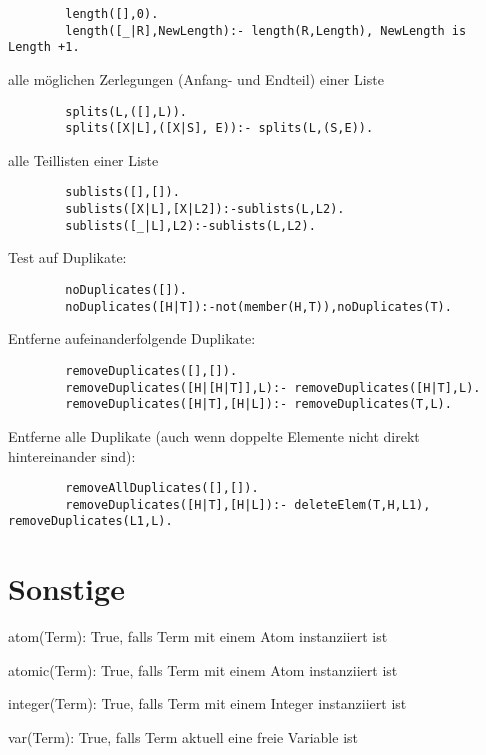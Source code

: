 \begin{compactitem}
		\begin{lstlisting}
		length([],0).
		length([_|R],NewLength):- length(R,Length), NewLength is Length +1.
		\end{lstlisting}	
	\item alle möglichen Zerlegungen (Anfang- und Endteil) einer Liste 
		\begin{lstlisting}
		splits(L,([],L)).
		splits([X|L],([X|S], E)):- splits(L,(S,E)).
		\end{lstlisting}	
	\item alle Teillisten einer Liste
		\begin{lstlisting}
		sublists([],[]).
		sublists([X|L],[X|L2]):-sublists(L,L2).
		sublists([_|L],L2):-sublists(L,L2).
		\end{lstlisting}
	\item Test auf Duplikate:
		\begin{lstlisting}
		noDuplicates([]).
		noDuplicates([H|T]):-not(member(H,T)),noDuplicates(T).
		\end{lstlisting}
	\item Entferne aufeinanderfolgende Duplikate:
		\begin{lstlisting}
		removeDuplicates([],[]).
		removeDuplicates([H|[H|T]],L):- removeDuplicates([H|T],L).
		removeDuplicates([H|T],[H|L]):- removeDuplicates(T,L).
		\end{lstlisting}
	\item Entferne alle Duplikate (auch wenn doppelte Elemente nicht direkt hintereinander sind):
		\begin{lstlisting}
		removeAllDuplicates([],[]).
		removeDuplicates([H|T],[H|L]):- deleteElem(T,H,L1), removeDuplicates(L1,L).
		\end{lstlisting}
\end{compactitem}

\section{Sonstige}
\begin{compactitem}
	\item atom(Term): True, falls Term mit einem Atom instanziiert ist 
	\item atomic(Term): True, falls Term mit einem Atom instanziiert ist 
	\item integer(Term): True, falls Term mit einem Integer instanziiert ist
	\item var(Term): True, falls Term aktuell eine freie Variable ist
\end{compactitem}